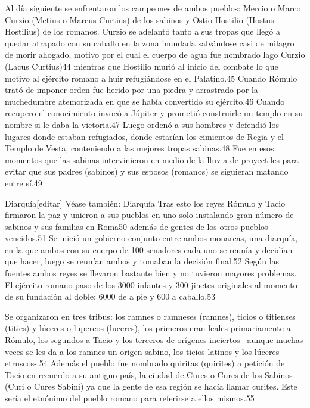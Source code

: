 \documentclass[11pt,a4paper]{book}
\begin{document}
	\bigskip
							Al día siguiente se enfrentaron los campeones de ambos pueblos: Mercio o Marco Curzio (Metius o Marcus Curtius) de los sabinos y Ostio Hostilio (Hostus Hostilius) de los romanos. Curzio se adelantó tanto a sus tropas que llegó a quedar atrapado con su caballo en la zona inundada salvándose casi de milagro de morir ahogado, motivo por el cual el cuerpo de agua fue nombrado lago Curzio (Lacus Curtius)44 mientras que Hostilio murió al inicio del combate lo que motivo al ejército romano a huir refugiándose en el Palatino.45 Cuando Rómulo trató de imponer orden fue herido por una piedra y arrastrado por la muchedumbre atemorizada en que se había convertido su ejército.46 Cuando recupero el conocimiento invocó a Júpiter y prometió construirle un templo en su nombre si le daba la victoria.47 Luego ordenó a sus hombres y defendió los lugares donde estaban refugiados, donde estarían los cimientos de Regia y el Templo de Vesta, conteniendo a las mejores tropas sabinas.48 Fue en esos momentos que las sabinas intervinieron en medio de la lluvia de proyectiles para evitar que sus padres (sabinos) y sus esposos (romanos) se siguieran matando entre sí.49
	\bigskip
							
	\bigskip
							Diarquía[editar]
	\bigskip
							Véase también: Diarquía
	\bigskip
							Tras esto los reyes Rómulo y Tacio firmaron la paz y unieron a sus pueblos en uno solo instalando gran número de sabinos y sus familias en Roma50 además de gentes de los otros pueblos vencidos.51 Se inició un gobierno conjunto entre ambos monarcas, una diarquía, en la que ambos con su cuerpo de 100 senadores cada uno se reunía y decidían que hacer, luego se reunían ambos y tomaban la decisión final.52 Según las fuentes ambos reyes se llevaron bastante bien y no tuvieron mayores problemas. El ejército romano paso de los 3000 infantes y 300 jinetes originales al momento de su fundación al doble: 6000 de a pie y 600 a caballo.53
	\bigskip
							
	\bigskip
							Se organizaron en tres tribus: los ramnes o ramneses (ramnes), ticios o titienses (tities) y lúceres o lupercos (luceres), los primeros eran leales primariamente a Rómulo, los segundos a Tacio y los terceros de orígenes inciertos –aunque muchas veces se les da a los ramnes un origen sabino, los ticios latinos y los lúceres etruscos-.54 Además el pueblo fue nombrado quiritas (quirites) a petición de Tacio en recuerdo a su antiguo país, la ciudad de Cures o Cures de los Sabinos (Curi o Cures Sabini) ya que la gente de esa región se hacía llamar curites. Este sería el etnónimo del pueblo romano para referirse a ellos mismos.55
	\bigskip
							
\end{document}
